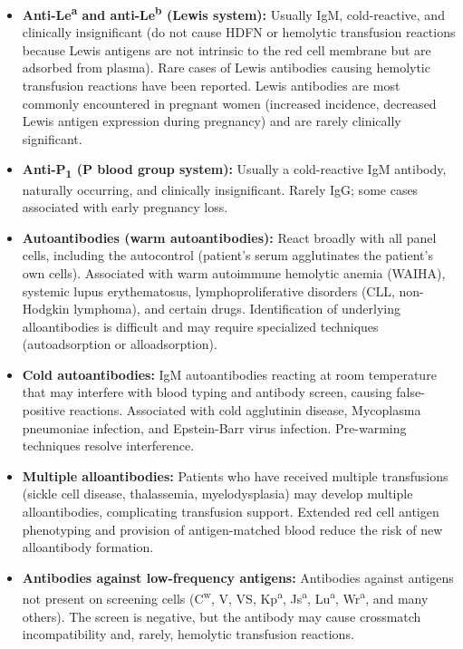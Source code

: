 \begin{itemize}
  \item \textbf{Anti-Le\textsuperscript{a} and anti-Le\textsuperscript{b} (Lewis system):} Usually IgM, cold-reactive, and clinically insignificant (do not cause HDFN or hemolytic transfusion reactions because Lewis antigens are not intrinsic to the red cell membrane but are adsorbed from plasma). Rare cases of Lewis antibodies causing hemolytic transfusion reactions have been reported. Lewis antibodies are most commonly encountered in pregnant women (increased incidence, decreased Lewis antigen expression during pregnancy) and are rarely clinically significant.
  \item \textbf{Anti-P\textsubscript{1} (P blood group system):} Usually a cold-reactive IgM antibody, naturally occurring, and clinically insignificant. Rarely IgG; some cases associated with early pregnancy loss.
  \item \textbf{Autoantibodies (warm autoantibodies):} React broadly with all panel cells, including the autocontrol (patient's serum agglutinates the patient's own cells). Associated with warm autoimmune hemolytic anemia (WAIHA), systemic lupus erythematosus, lymphoproliferative disorders (CLL, non-Hodgkin lymphoma), and certain drugs. Identification of underlying alloantibodies is difficult and may require specialized techniques (autoadsorption or alloadsorption).
  \item \textbf{Cold autoantibodies:} IgM autoantibodies reacting at room temperature that may interfere with blood typing and antibody screen, causing false-positive reactions. Associated with cold agglutinin disease, Mycoplasma pneumoniae infection, and Epstein-Barr virus infection. Pre-warming techniques resolve interference.
  \item \textbf{Multiple alloantibodies:} Patients who have received multiple transfusions (sickle cell disease, thalassemia, myelodysplasia) may develop multiple alloantibodies, complicating transfusion support. Extended red cell antigen phenotyping and provision of antigen-matched blood reduce the risk of new alloantibody formation.
  \item \textbf{Antibodies against low-frequency antigens:} Antibodies against antigens not present on screening cells (C\textsuperscript{w}, V, VS, Kp\textsuperscript{a}, Js\textsuperscript{a}, Lu\textsuperscript{a}, Wr\textsuperscript{a}, and many others). The screen is negative, but the antibody may cause crossmatch incompatibility and, rarely, hemolytic transfusion reactions.
\end{itemize}


